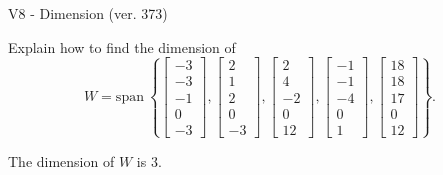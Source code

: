 \begin{exercise}
  \begin{exerciseTitle}V8 - Dimension (ver. 373)\end{exerciseTitle}
  \begin{exerciseStatement}
    Explain how to find the dimension of 
\[W=\mathrm{span}\ \left\{\left[\begin{array}{r}
-3 \\
-3 \\
-1 \\
0 \\
-3
\end{array}\right] , \left[\begin{array}{r}
2 \\
1 \\
2 \\
0 \\
-3
\end{array}\right] , \left[\begin{array}{r}
2 \\
4 \\
-2 \\
0 \\
12
\end{array}\right] , \left[\begin{array}{r}
-1 \\
-1 \\
-4 \\
0 \\
1
\end{array}\right] , \left[\begin{array}{r}
18 \\
18 \\
17 \\
0 \\
12
\end{array}\right]\right\}.\]



  \end{exerciseStatement}
  \begin{exerciseAnswer}
   The dimension of \(W\) is  \(3\).
  


  \end{exerciseAnswer}
\end{exercise}